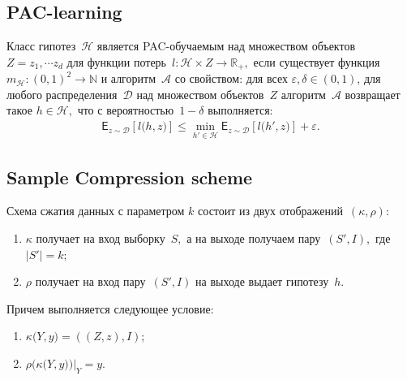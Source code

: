\documentclass[../main.tex]{subfiles}
\begin{document}
\subsection{PAC-learning}

\begin{definition}
Класс гипотез~$\mathcal{H}$ является PAC-обучаемым над множеством объектов~$Z=z_1, \cdots z_d$ для функции потерь~$l:\mathcal{H}\times Z\to \mathbb{R}_{+},$ если существует функция~$m_{\mathcal{H}}:\left(0,1\right)^2\to \mathbb{N}$ и алгоритм~$\mathcal{A}$ со свойством:
для всех $\varepsilon, \delta \in \left(0,1\right)$, для любого распределения~$\mathcal{D}$ над множеством объектов~$Z$ алгоритм~$\mathcal{A}$ возвращает такое $h\in \mathcal{H},$ что с вероятностью~$1-\delta$ выполняется:
\[
\begin{aligned}
\mathsf{E}_{z\sim \mathcal{D}}\left[l\bigr(h, z\bigr)\right] \leq \min_{h'\in \mathcal{H}} \mathsf{E}_{z\sim \mathcal{D}}\left[l\bigr(h', z\bigr)\right] +\varepsilon.
\end{aligned}
\]
\end{definition}

\subsection{Sample Compression scheme}
Схема сжатия данных с параметром $k$ состоит из двух отображений~$\left(\kappa, \rho\right):$
\begin{enumerate}
    \item $\kappa$ получает на вход выборку~$S,$ а на выходе получаем пару~$\left(S', I\right),$ где $|S'|=k$;
    \item $\rho$ получает на вход пару~$\left(S', I\right)$ на выходе выдает гипотезу~$h$.
\end{enumerate}
Причем выполняется следующее условие:
\begin{enumerate}
    \item $\kappa\bigr(Y, y\bigr) = \left(\left(Z, z\right), I\right)$;
    \item $\rho\bigr(\kappa\bigr(Y, y\bigr)\bigr)|_{Y} = y$.
\end{enumerate}
\end{document}
